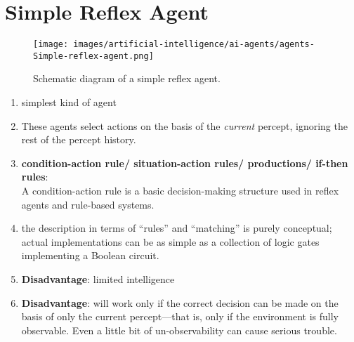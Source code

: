 \section{Simple Reflex Agent}


\begin{figure}[H]
    \centering
    \texttt{[image: images/artificial-intelligence/ai-agents/agents-Simple-reflex-agent.png]}
    \caption*{Schematic diagram of a simple reflex agent. \cite{common/online/tools/draw.io}}
\end{figure}

\begin{enumerate}[itemsep=0.2cm]
    \item simplest kind of agent
    \hfill \cite{ai/book/Artificial-Intelligence-A-Modern-Approach/Russell-Norvig}

    \item These agents select actions on the basis of the \textit{current} percept, ignoring the rest of the percept history.
    \hfill \cite{ai/book/Artificial-Intelligence-A-Modern-Approach/Russell-Norvig}

    \item \textbf{condition-action rule/ situation-action rules/ productions/ if-then rules}:\\
    A condition-action rule is a basic decision-making structure used in reflex agents and rule-based systems.
    \hfill \cite{ai/book/Artificial-Intelligence-A-Modern-Approach/Russell-Norvig, common/online/chatgpt}

    \item the description in terms of “rules” and “matching” is purely conceptual; actual implementations can be as simple as a collection of logic gates implementing a Boolean circuit.
    \hfill \cite{ai/book/Artificial-Intelligence-A-Modern-Approach/Russell-Norvig}

    \item \textbf{Disadvantage}: limited intelligence
    \hfill \cite{ai/book/Artificial-Intelligence-A-Modern-Approach/Russell-Norvig}

    \item \textbf{Disadvantage}: will work only if the correct decision can be made on the basis of only the current percept—that is, only if the environment is fully observable. Even a little bit of un-observability can cause serious trouble.
    \hfill \cite{ai/book/Artificial-Intelligence-A-Modern-Approach/Russell-Norvig}

\end{enumerate}


